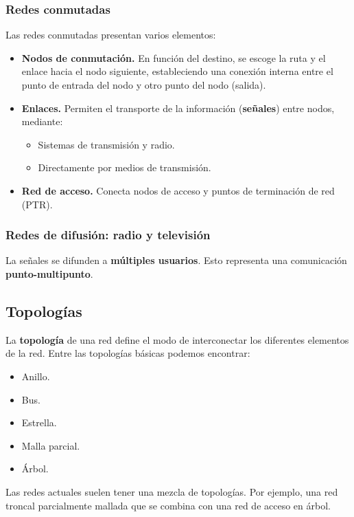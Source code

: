 \documentclass[a4paper]{book}
\begin{document}
\subsubsection{Redes conmutadas}
Las redes conmutadas presentan varios elementos:
\begin{itemize}
  \item \textbf{Nodos de conmutación.} En función del destino, se escoge la ruta y el enlace hacia el nodo siguiente, estableciendo una conexión interna entre el punto de entrada del nodo y otro punto del nodo (salida).
  \item \textbf{Enlaces.} Permiten el transporte de la información (\textbf{señales}) entre nodos, mediante:
        \begin{itemize}
          \item Sistemas de transmisión y radio.
          \item Directamente por medios de transmisión.
        \end{itemize}
  \item \textbf{Red de acceso.} Conecta nodos de acceso y puntos de terminación de red (PTR).
\end{itemize}

\subsubsection{Redes de difusión: radio y televisión}
La señales se difunden a \textbf{múltiples usuarios}. Esto representa una comunicación \textbf{punto-multipunto}.

\subsection{Topologías}
La \textbf{topología} de una red define el modo de interconectar los diferentes elementos de la red. Entre las topologías básicas podemos encontrar:
\begin{multicols}{3}
  \begin{itemize}
    \item Anillo.
    \item Bus.
    \item Estrella.
    \item Malla parcial.
    \item Árbol.
  \end{itemize}
\end{multicols}

Las redes actuales suelen tener una mezcla de topologías. Por ejemplo, una red troncal parcialmente mallada que se combina con una red de acceso en árbol.
\end{document}
